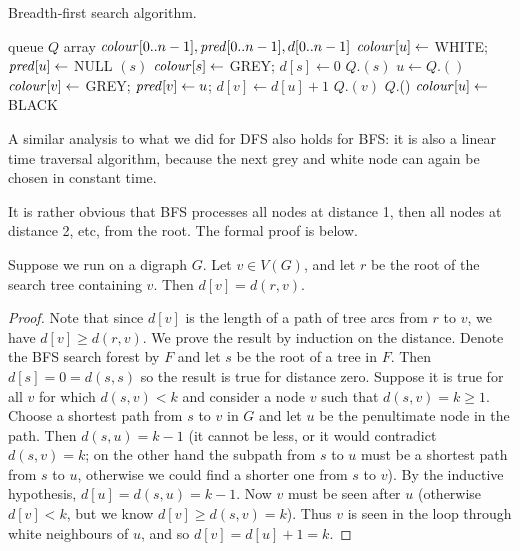 \begin{algorithm}[H]
  \caption{Breadth-first search algorithm.}
    \label{alg:BFScode}
\begin{algorithmic}[1]
	\State queue $Q$  
	\State array $\operatorname{\text{\textit{colour}}}[0..n-1], \operatorname{\text{\textit{pred}}}[0..n-1], d[0..n-1]$
		\State $\operatorname{\text{\textit{colour}}}[u] \gets $ WHITE; $\operatorname{\text{\textit{pred}}}[u] \gets $ NULL
	\EndFor
			\State {}$(s)$
		\EndIf
	\EndFor
	\State {}
\EndFunction
{}
	\State $\operatorname{\text{\textit{colour}}}[s] \gets $ GREY; $d[s] \gets 0$ 
	\State $Q$.$(s)$
		\State $u \gets Q$.$()$
				\State $\operatorname{\text{\textit{colour}}}[v] \gets $ GREY; $\operatorname{\text{\textit{pred}}}[v] \gets u$; $d[v] \gets d[u]+1$
				\State $Q$.$(v)$
			\EndIf
		\EndFor
		\State $Q$.()
		\State $\operatorname{\text{\textit{colour}}}[u] \gets $ BLACK
	\EndWhile
\EndFunction
\end{algorithmic}
\end{algorithm}

A similar analysis to what we did for DFS also holds for BFS: it is also
a linear time traversal algorithm, because the next grey and white node 
can again be chosen in constant time.

It is rather obvious that BFS processes all nodes at distance 1, then
all nodes at distance 2, etc, from the root. The formal proof is below.

\begin{Theorem}
\label{thm:BFSdist}
Suppose we run  on a digraph $G$.
Let $v\in V(G)$, and let $r$ be the root of the search tree containing $v$. 
Then $d[v] = d(r, v)$.
\end{Theorem}

\begin{proof}
Note that since $d[v]$ is the length of a path of tree arcs
from $r$ to $v$, we have $d[v] \geq d(r, v)$. We prove the result by
induction on the distance. Denote the BFS search forest by $F$ and let $s$
be the root of a tree in $F$. Then $d[s] = 0 = d(s, s)$ so the result is
true for distance zero. Suppose it is true for all $v$ for which $d(s,
v) < k$ and consider a node $v$ such that $d(s, v) = k \geq 1$. Choose
a shortest path from $s$ to $v$ in $G$ and let $u$ be the penultimate
node in the path. Then $d(s, u) = k - 1$ (it cannot be less, or it would
contradict $d(s, v) = k$; on the other hand the subpath from $s$ to $u$
must be a shortest path from $s$ to $u$, otherwise we could find a shorter
one from $s$ to $v$). By the inductive hypothesis, $d[u] = d(s, u) = k -
1$. Now $v$ must be seen after $u$ (otherwise $d[v] < k$, but we know
$d[v] \geq d(s, v) = k$). Thus $v$ is seen in the loop through white
neighbours of $u$, and so $d[v] = d[u] + 1 = k$. 
\end{proof}

